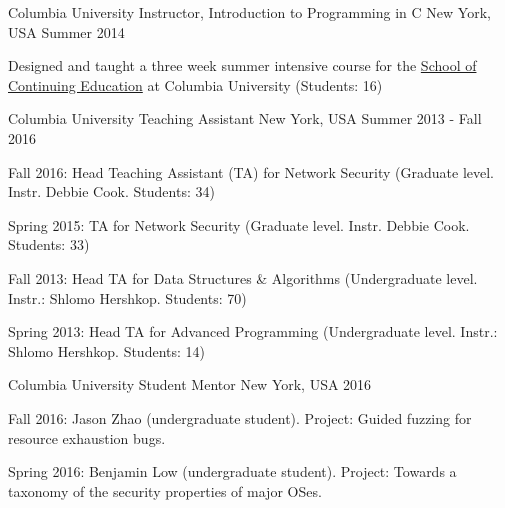 

\begin{cventries}

  \cventry
    {Columbia University}
    {Instructor, Introduction to Programming in C}
    {New York, USA}
    {Summer 2014}
    {
    \begin{cvitems}
    \item Designed and taught a three week summer intensive course for the
        \href{http://sps.columbia.edu/high-school/nyc/junior-senior-courses/introduction-programming-in-c}{School of Continuing Education} at Columbia University (Students: 16)
    \end{cvitems}
    }
  \cventry
    {Columbia University}
    {Teaching Assistant}
    {New York, USA}
    {Summer 2013 - Fall 2016}
    {
      \begin{cvitems} %
      \item {Fall 2016: Head Teaching Assistant (TA) for Network Security (Graduate level. Instr. Debbie Cook. Students: 34)}
      \item {Spring 2015: TA for Network Security (Graduate level. Instr. Debbie Cook. Students: 33)}
        \item {Fall 2013: Head TA for Data Structures \& Algorithms (Undergraduate level. Instr.: Shlomo Hershkop. Students: 70)}
        \item {Spring 2013: Head TA for Advanced Programming (Undergraduate level. Instr.: Shlomo Hershkop. Students: 14)}\\
      \end{cvitems}
    }


\cventry
    {Columbia University}
    {Student Mentor}
    {New York, USA}
    {2016}
    {
      \begin{cvitems}
      \item {Fall 2016: Jason Zhao (undergraduate student). Project: Guided fuzzing for resource exhaustion bugs.}
      \item {Spring 2016: Benjamin Low (undergraduate student). Project: Towards a taxonomy of the security properties of major OSes.}
      \end{cvitems}
    }
\end{cventries}
